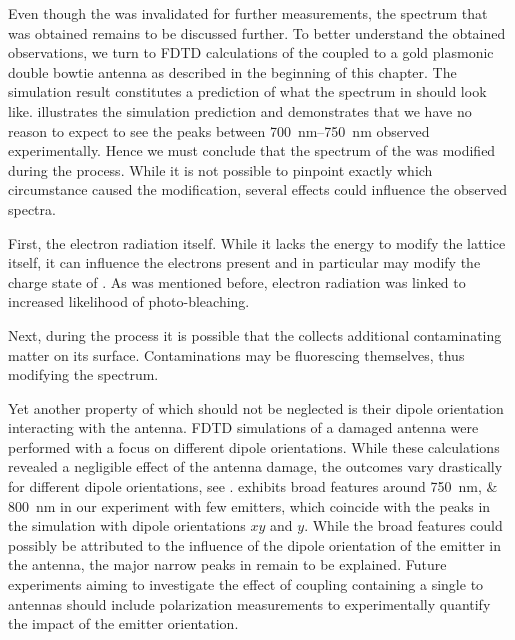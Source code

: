 				Even though the \nd was invalidated for further measurements, the spectrum that was obtained remains to be discussed further. To better understand the obtained observations, we turn to FDTD calculations of the \nd coupled to a gold plasmonic double bowtie antenna as described in the beginning of this chapter. The simulation result constitutes a prediction of what the spectrum in  should look like.  illustrates the simulation prediction and demonstrates that we have no reason to expect to see the peaks between \SIrange{700}{750}{nm} observed experimentally. Hence we must conclude that the spectrum of the \nd was modified during the \pp process. While it is not possible to pinpoint exactly which circumstance caused the modification, several effects could influence the observed spectra.
			
				First, the electron radiation itself. While it lacks the energy to modify the lattice itself, it can influence the electrons present and in particular may modify the charge state of \sivs. As was mentioned before, electron radiation was linked to increased likelihood of photo-bleaching.
				
				Next, during the \pp process it is possible that the \nd collects additional contaminating matter on its surface. Contaminations may be fluorescing themselves, thus modifying the spectrum.
				
				Yet another property of \sivs which should not be neglected is their dipole orientation interacting with the antenna.
				FDTD simulations of a damaged antenna were performed with a focus on different dipole orientations.
				While these calculations revealed a negligible effect of the antenna damage, the outcomes vary drastically for different dipole orientations, see .
				 exhibits broad features around \SIlist{750;800}{nm} in our experiment with few emitters, which coincide with the peaks in the simulation with dipole orientations $xy$ and $y$. While the broad features could possibly be attributed to the influence of the dipole orientation of the emitter in the antenna, the major narrow peaks in  remain to be explained.
				Future experiments aiming to investigate the effect of coupling \nds containing a single \siv to antennas should include polarization measurements to experimentally quantify the impact of the emitter orientation.
				
